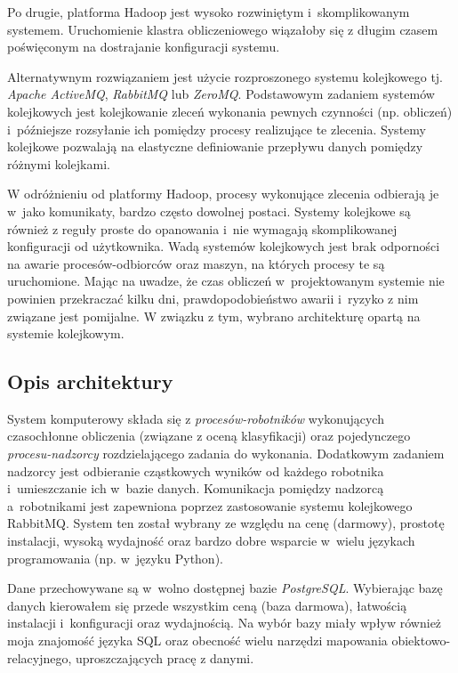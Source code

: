\documentclass[../thesis.tex]{subfiles}
\begin{document}
Po drugie, platforma Hadoop jest wysoko rozwiniętym i~skomplikowanym systemem. Uruchomienie klastra obliczeniowego wiązałoby się z długim czasem poświęconym na dostrajanie konfiguracji systemu.

Alternatywnym rozwiązaniem jest użycie rozproszonego systemu kolejkowego tj. \emph{Apache ActiveMQ}, \emph{RabbitMQ} lub \emph{ZeroMQ}. Podstawowym zadaniem systemów kolejkowych jest kolejkowanie zleceń wykonania pewnych czynności (np. obliczeń) i~późniejsze rozsyłanie ich pomiędzy procesy realizujące te zlecenia. Systemy kolejkowe pozwalają na elastyczne definiowanie przepływu danych pomiędzy różnymi kolejkami. 

W odróżnieniu od platformy Hadoop, procesy wykonujące zlecenia odbierają je w~jako komunikaty, bardzo często dowolnej postaci. Systemy kolejkowe są również z reguły proste do opanowania i~nie wymagają skomplikowanej konfiguracji od użytkownika. Wadą systemów kolejkowych jest brak odporności na awarie procesów-odbiorców oraz maszyn, na których procesy te są uruchomione. Mając na uwadze, że czas obliczeń w~projektowanym systemie nie powinien przekraczać kilku dni, prawdopodobieństwo awarii i~ryzyko z nim związane jest pomijalne. W związku z tym, wybrano architekturę opartą na systemie kolejkowym.

\subsection{Opis architektury}

System komputerowy składa się z \emph{procesów-robotników} wykonujących czasochłonne obliczenia (związane z oceną klasyfikacji) oraz pojedynczego \emph{procesu-nadzorcy} rozdzielającego zadania do wykonania. Dodatkowym zadaniem nadzorcy jest odbieranie cząstkowych wyników od każdego robotnika i~umieszczanie ich w~bazie danych. Komunikacja pomiędzy nadzorcą a~robotnikami jest zapewniona poprzez zastosowanie systemu kolejkowego RabbitMQ. System ten został wybrany ze względu na cenę (darmowy), prostotę instalacji, wysoką wydajność oraz bardzo dobre wsparcie w~wielu językach programowania (np. w~języku Python).

Dane przechowywane są w~wolno dostępnej bazie \emph{PostgreSQL}. Wybierając bazę danych kierowałem się przede wszystkim ceną (baza darmowa), łatwością instalacji i~konfiguracji oraz wydajnością. Na wybór bazy miały wpływ również moja znajomość języka SQL oraz obecność wielu narzędzi mapowania obiektowo-relacyjnego, uproszczających pracę z danymi. 
\end{document}
